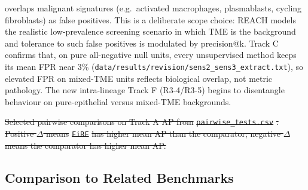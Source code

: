 \documentclass[10pt]{article}
\providecommand{\DIFaddtex}[1]{{\protect\color{trackgreen}#1}} %
\providecommand{\DIFdeltex}[1]{{\protect\color{red}\sout{#1}}}                      %
\providecommand{\DIFaddend}{} %
\providecommand{\DIFdelbegin}{} %
\providecommand{\DIFaddFL}[1]{\DIFadd{#1}} %
\providecommand{\DIFdelFL}[1]{\DIFdel{#1}} %
\providecommand{\DIFaddbeginFL}{} %
\providecommand{\DIFdelendFL}{} %
\providecommand{\DIFadd}[1]{\texorpdfstring{\DIFaddtex{#1}}{#1}} %
\providecommand{\DIFdel}[1]{\texorpdfstring{\DIFdeltex{#1}}{}} %
\newcommand{\DIFscaledelfig}{0.5}
\newlength{\DIFdelgraphicswidth} %
\newlength{\DIFdelgraphicsheight} %
\newcommand{\DIFaddincludegraphics}[2][]{{\color{trackgreen}\fbox{\DIFOincludegraphics[#1]{#2}}}} %
\newcommand{\DIFdelincludegraphics}[2][]{%
\sbox{\DIFdelgraphicsbox}{\DIFOincludegraphics[#1]{#2}}%
\settoboxwidth{\DIFdelgraphicswidth}{\DIFdelgraphicsbox} %
\settoboxtotalheight{\DIFdelgraphicsheight}{\DIFdelgraphicsbox} %
\scalebox{\DIFscaledelfig}{%
\parbox[b]{\DIFdelgraphicswidth}{\usebox{\DIFdelgraphicsbox}\\[-\baselineskip] \rule{\DIFdelgraphicswidth}{0em}}\llap{\resizebox{\DIFdelgraphicswidth}{\DIFdelgraphicsheight}{%
\setlength{\unitlength}{\DIFdelgraphicswidth}%
\begin{picture}(1,1)%
\thicklines\linethickness{2pt} %
{\color[rgb]{1,0,0}\put(0,0){\framebox(1,1){}}}%
{\color[rgb]{1,0,0}\put(0,0){\line( 1,1){1}}}%
{\color[rgb]{1,0,0}\put(0,1){\line(1,-1){1}}}%
\end{picture}%
}\hspace*{3pt}}} %
} %
\DeclareRobustCommand{\DIFaddend}{\DIFOaddend \let\includegraphics\DIFOincludegraphics} %
\DeclareRobustCommand{\DIFdelbegin}{\DIFOdelbegin \let\includegraphics\DIFdelincludegraphics} %
\DeclareRobustCommand{\DIFaddbeginFL}{\DIFOaddbeginFL \let\includegraphics\DIFaddincludegraphics} %
\DeclareRobustCommand{\DIFdelendFL}{\DIFOaddendFL \let\includegraphics\DIFOincludegraphics} %
\begin{document}
\begin{enumerate}
{  overlaps malignant signatures (e.g.~activated macrophages,
  plasmablasts, cycling fibroblasts) as false positives. This is a
  deliberate scope choice: REACH models the realistic low-prevalence
  screening scenario in which TME is the background and tolerance to
  such false positives is modulated by precision@k. Track C confirms
  that, on pure all-negative null units, every unsupervised method keeps
  its mean FPR near 3\%
  (}\texttt{\DIFadd{data/results/revision/sens2\_sens3\_extract.txt}}\DIFadd{), so
  elevated FPR on mixed-TME units reflects biological overlap, not
  metric pathology. The new intra-lineage Track F (R3-4/R3-5) begins to
  disentangle behaviour on pure-epithelial versus mixed-TME backgrounds.
}\end{enumerate}
\DIFaddend 

\DIFdelbegin %
{%
\DIFdelFL{Selected pairwise comparisons on Track A AP from
}\texttt{\DIFdelFL{pairwise\_tests.csv}}%
\DIFdelFL{. Positive $\Delta$ means }\texttt{\DIFdelFL{FiRE}} %
\DIFdelFL{has
higher mean AP than the comparator; negative $\Delta$ means the
comparator has higher mean AP.}}
\DIFdelendFL \DIFaddbeginFL \begin{center}\DIFaddFL{\rule{0.5\linewidth}{0.5pt}}\end{center}

\subsection{\DIFaddFL{Comparison to Related
Benchmarks}}\label{comparison-to-related-benchmarks}
\end{document}
